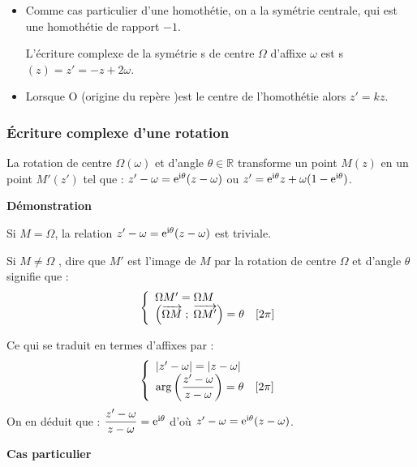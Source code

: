 \begin{remark}
\begin{itemize}
\item Comme cas particulier d'une homothétie, on a la symétrie centrale, qui est 
une homothétie de rapport $ -1 $.

 L'écriture complexe de la symétrie s de centre $ \Omega $ d'affixe $ \omega $  est s$(z)= z'=-z+2 \omega $.
 \item Lorsque O (origine du repère )est le centre de l'homothétie alors $ z'= k z $.
\end{itemize}
\end{remark}
\subsubsection*{Écriture complexe d'une rotation}
\begin{theorem}
 La rotation de centre $ \Omega  (\omega ) $ et d'angle  $ \theta\in\mathbb{R} $ transforme un point  $ M( z )$  en un point $ M'(z ')$  tel que : $ z'-\omega =\mathrm{e}^{\text{i} \theta}(z-\omega) $ ou  $ z'=\mathrm{e}^{\text{i} \theta}z +\omega(1-\mathrm{e}^{\text{i} \theta}) $.
 \end{theorem}
 \medskip

\textbf{Démonstration}

\medskip
Si $ M=\Omega $, la relation  $ z'-\omega =\mathrm{e}^{\text{i} \theta}(z-\omega) $  est triviale.

 Si $ M \neq\Omega  $ , dire que $ M' $
est l'image de $ M $ par la rotation de centre $ \Omega $ et d'angle $ \theta $ signifie  que : $$  \left\{\begin{array}{l c l}
\Omega M'=\Omega M \\ 	 
 \paren{\overrightarrow{\Omega M} \; ;\;  \overrightarrow{ \Omega M'}} =\theta \quad  [2\pi]\\

\end{array}\right.  $$


Ce qui se traduit en termes d'affixes par :$$  \left\{\begin{array}{l c l}
\abs{z'-\omega}=\abs{z-\omega}\\ 	 
\text{arg}\paren{\dfrac{z'-\omega}{z-\omega}} =\theta \quad  [2\pi]\\

\end{array}\right.  $$
On en déduit  que :  $ \dfrac{z'-\omega}{z-\omega}= \eexp{\i \theta} $ d'où  $ z'-\omega =\eexp{\i \theta}(z-\omega) $.

\medskip
\textbf{Cas particulier}

